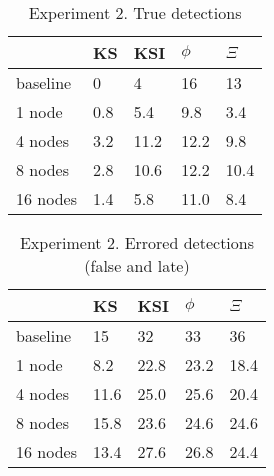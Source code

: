 \begin{table}[h]
    \centering
    \begin{tabular}{|l||l|l|l|l|}
        \hline
         & KS & KSI & $\phi$ & $\Xi$ \\ \hline
        baseline & 0 & 4 & 16 & 13 \\ \hline
        1 node & 0.8 & 5.4 & 9.8 & 3.4 \\ \hline
        4 nodes & 3.2 & 11.2 & 12.2 & 9.8 \\ \hline
        8 nodes & 2.8 & 10.6 & 12.2 & 10.4 \\ \hline
        16 nodes & 1.4 & 5.8 & 11.0 & 8.4 \\ \hline
    \end{tabular}
    \caption{Experiment 2. True detections}
\end{table}

\begin{table}[h]
    \centering
    \begin{tabular}{|l||l|l|l|l|}
        \hline
         & KS & KSI & $\phi$ & $\Xi$ \\ \hline
        baseline & 15 & 32 & 33 & 36 \\ \hline
        1 node & 8.2 & 22.8 & 23.2 & 18.4  \\ \hline
        4 nodes & 11.6 & 25.0 & 25.6 & 20.4 \\ \hline
        8 nodes & 15.8 & 23.6 & 24.6 & 24.6  \\ \hline
        16 nodes & 13.4 & 27.6 & 26.8 & 24.4 \\ \hline
    \end{tabular}
    \caption{Experiment 2. Errored detections (false and late)}
\end{table}


